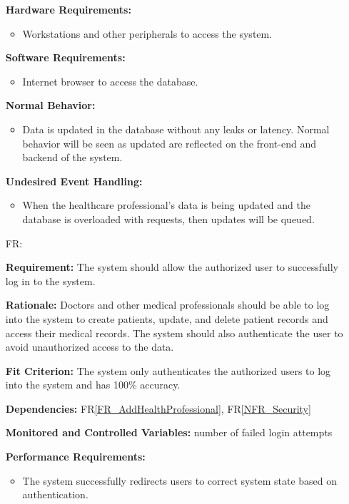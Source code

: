 \documentclass[12pt]{article}
\newcounter{reqnum} %
\begin{document}
\begin{itemize}
  \textbf{Hardware Requirements:}
  \begin{itemize}
    \item Workstations and other peripherals to access the system.
  \end{itemize} 
  
  \textbf{Software Requirements:}
  \begin{itemize}
    \item Internet browser to access the database.
  \end{itemize} 
  
  \textbf{Normal Behavior:}
  \begin{itemize}
    \item Data is updated in the database without any leaks or latency. Normal behavior will be seen as updated are reflected on the front-end and backend of the system.
  \end{itemize} 
  
  \textbf{Undesired Event Handling:}
  \begin{itemize}
    \item When the healthcare professional's data is being updated and the database is overloaded with requests, then updates will be queued.
  \end{itemize} 
  
  \item[FR\refstepcounter{reqnum}\thereqnum \label{FR_login}:]
  
  \textbf{Requirement:} The system should allow the authorized user to successfully log in to the system.
  
  \textbf{Rationale:} Doctors and other medical professionals should be able to log into the system to create patients, update, and delete patient records and access their medical records. The system should also authenticate the user to avoid unauthorized access to the data.
  
  \textbf{Fit Criterion:} The system only authenticates the authorized users to log into the system and has 100\% accuracy. 
  
  \textbf{Dependencies:} FR\ref{FR_AddHealthProfessional}, FR\ref{NFR_Security}
  
  \textbf{Monitored and Controlled Variables:} number of failed login attempts
  
  \textbf{Performance Requirements:} 
  \begin{itemize}
    \item The system successfully redirects users to correct system state based on authentication.
  \end{itemize}
  

\end{itemize}
\end{document}
